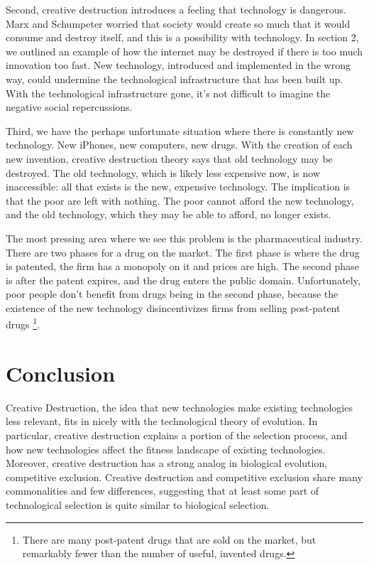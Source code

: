 \documentclass[11pt]{article}
\begin{document}
Second, creative destruction introduces a feeling that technology is dangerous.
Marx and Schumpeter worried that society would create so much that it would consume and destroy itself, and this is a possibility with technology.
In section 2, we outlined an example of how the internet may be destroyed if there is too much innovation too fast.
New technology, introduced and implemented in the wrong way, could undermine the technological infrastructure that has been built up. 
With the technological infrastructure gone, it's not difficult to imagine the negative social repercussions.

Third, we have the perhaps unfortunate situation where there is constantly new technology.
New iPhones, new computers, new drugs.
With the creation of each new invention, creative destruction theory says that old technology may be destroyed.
The old technology, which is likely less expensive now, is now inaccessible: all that exists is the new, expensive technology.
The implication is that the poor are left with nothing. 
The poor cannot afford the new technology, and the old technology, which they may be able to afford, no longer exists.

The most pressing area where we see this problem is the pharmaceutical industry.
There are two phases for a drug on the market. 
The first phase is where the drug is patented, the firm has a monopoly on it and prices are high.
The second phase is after the patent expires, and the drug enters the public domain. 
Unfortunately, poor people don't benefit from drugs being in the second phase, because the existence of the new technology disincentivizes firms from selling post-patent drugs \footnote{There are many post-patent drugs that are sold on the market, but remarkably fewer than the number of useful, invented drugs.}.


\section{Conclusion}
Creative Destruction, the idea that new technologies make existing technologies less relevant, fits in nicely with the technological theory of evolution.
In particular, creative destruction explains a portion of the selection process, and how new technologies affect the fitness landscape of existing technologies.
Moreover, creative destruction has a strong analog in biological evolution, competitive exclusion.
Creative destruction and competitive exclusion share many commonalities and few differences, suggesting that at least some part of technological selection is quite similar to biological selection.
\end{document}
